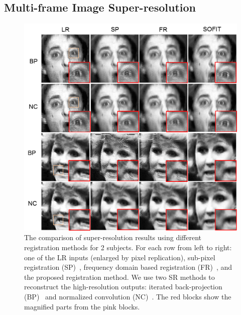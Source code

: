\documentclass[10pt,journal]{IEEEtran}
\begin{document}
\subsection{Multi-frame Image Super-resolution}

\begin{figure}[t]
	\centering
		\includegraphics[width=\columnwidth]{fig/superResolution.png}
	\caption{The comparison of super-resolution results using different registration methods for 2 subjects. For each row from left to right: one of the LR inputs (enlarged by pixel replication), sub-pixel registration (SP)~\cite{Keren_CVPR88}, frequency domain based registration (FR)~\cite{Vandewalle06}, and the proposed registration method. We use two SR methods to reconstruct the high-resolution outputs: iterated back-projection (BP)~\cite{Irani91} and normalized convolution (NC)~\cite{Pham_06}. The red blocks show the magnified parts from the pink blocks.}
	\label{fig:superResolution}
\end{figure}
\end{document}
